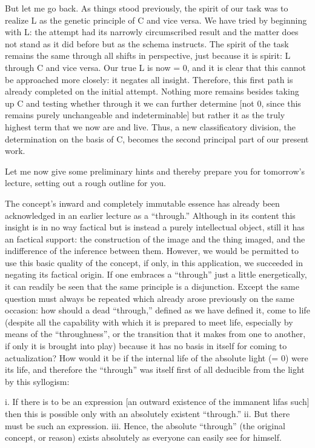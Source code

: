 But let me go back.
As things stood previously,
the spirit of our task was to realize
L as the genetic principle of C and vice versa.
We have tried by beginning with L:
the attempt had its narrowly circumscribed result
and the matter does not stand as it did before
but as the schema instructs.
The spirit of the task remains the same
through all shifts in perspective,
just because it is spirit:
L through C and vice versa.
Our true L is now = 0,
and it is clear that
this cannot be approached more closely:
it negates all insight.
Therefore, this first path is
already completed on the initial attempt.
Nothing more remains besides
taking up C and testing whether
through it we can further determine
[not 0, since this remains purely
unchangeable and indeterminable]
but rather it as the truly highest term
that we now are and live.
Thus, a new classificatory division,
the determination on the basis of C,
becomes the second principal part
of our present work.

Let me now give some preliminary hints
and thereby prepare you for tomorrow's lecture,
setting out a rough outline for you.

The concept's inward and completely immutable essence has
already been acknowledged in an earlier lecture as a “through.”
Although in its content this insight is in no way factical
but is instead a purely intellectual object,
still it has an factical support:
the construction of the image and the thing imaged,
and the indifference of the inference between them.
However, we would be permitted to use this basic quality of the concept,
if only, in this application, we succeeded in negating its factical origin.
If one embraces a “through” just a little energetically,
it can readily be seen that the same principle is a disjunction.
Except the same question must always be repeated which
already arose previously on the same occasion:
how should a dead “through,” defined as we have defined it,
come to life
(despite all the capability with
which it is prepared to meet life,
especially by means of the “throughness”,
or the transition that it makes from one to another,
if only it is brought into play)
because it has no basis in itself
for coming to actualization?
How would it be if the internal life
of the absolute light (= 0) were its life,
and therefore the “through” was itself
first of all deducible from the light by this syllogism:

i. If there is to be an expression
[an outward existence of the immanent lifas such]
then this is possible only with an absolutely existent “through.”
ii. But there must be such an expression.
iii. Hence, the absolute “through” (the original concept, or reason)
exists absolutely as everyone can easily see for himself.

